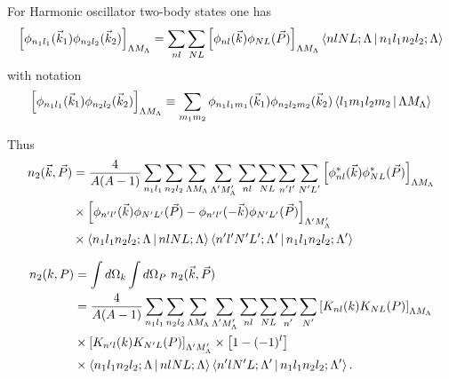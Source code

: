 \documentclass[12pt]{article}
\begin{document}
For Harmonic oscillator two-body states one has
\begin{align*}
\left[ \phi_{n_1l_1}(\vec{k}_1)\phi_{n_2l_2}(\vec{k}_2) \right]_{\Lambda M_\Lambda} = \sum_{\substack{nl}} \sum_{\substack{NL}} \left[ \phi_{nl}(\vec{k})\phi_{NL}(\vec{P}) \right]_{\Lambda M_\Lambda} \Braket{nlNL;\Lambda | n_1l_1n_2l_2;\Lambda}
\end{align*}
with notation 
\begin{equation*}
\left[ \phi_{n_1l_1}(\vec{k}_1)\phi_{n_2l_2}(\vec{k}_2) \right]_{\Lambda M_\Lambda} \equiv \sum_{m_1m_2} \phi_{n_1l_1m_1}(\vec{k}_1) \phi_{n_2l_2m_2}(\vec{k}_2) \Braket{l_1m_1l_2m_2|\Lambda M_\Lambda}
\end{equation*}

Thus
\begin{align}
n_2(\vec{k},\vec{P}) 
& = \frac{4}{A(A-1)}\sum_{\substack{n_1l_1}} \sum_{\substack{n_2l_2}} \sum_{\substack{\Lambda M_\Lambda}} \sum_{\substack{\Lambda^\prime M_\Lambda^\prime}} \sum_{\substack{nl}} \sum_{\substack{NL}} \sum_{\substack{n^\prime l^\prime}} \sum_{\substack{N^\prime L^\prime}} \left[ \phi^*_{nl}(\vec{k})\phi^*_{NL}(\vec{P}) \right]_{\Lambda M_\Lambda} \nonumber \\
  & \times \left[ \phi_{n^\prime l^\prime}(\vec{k})\phi_{N^\prime L^\prime}(\vec{P}) -  \phi_{n^\prime l^\prime}(-\vec{k})\phi_{N^\prime L^\prime}(\vec{P})\right]_{\Lambda^\prime M_\Lambda^\prime} \\
  & \times	\Braket{n_1l_1n_2l_2;\Lambda | nlNL;\Lambda} \Braket{n^\prime l^\prime N^\prime L^\prime;\Lambda^\prime |n_1l_1n_2l_2;\Lambda^\prime}
\end{align}

\begin{align}
n_2(k,P) & = \int d\Omega_k \int d\Omega_P\  n_2(\vec{k},\vec{P})  \\
& = \frac{4}{A(A-1)}\sum_{\substack{n_1l_1}} \sum_{\substack{n_2l_2}} \sum_{\substack{\Lambda M_\Lambda}} \sum_{\substack{\Lambda^\prime M_\Lambda^\prime}} \sum_{\substack{nl}} \sum_{\substack{NL}} \sum_{\substack{n^\prime}} \sum_{\substack{N^\prime }} \left[ K_{nl}(k) K_{NL}(P) \right]_{\Lambda M_\Lambda} \nonumber \\
  & \times \left[ K_{n^\prime l}(k) K_{N^\prime L}(P)\right]_{\Lambda^\prime M_\Lambda^\prime}  \times \left[ 1 - (-1)^l \right] \\
  & \times	\Braket{n_1l_1n_2l_2;\Lambda | nlNL;\Lambda} \Braket{n^\prime l N^\prime L;\Lambda^\prime |n_1l_1n_2l_2;\Lambda^\prime}.
\end{align}
\end{document}
